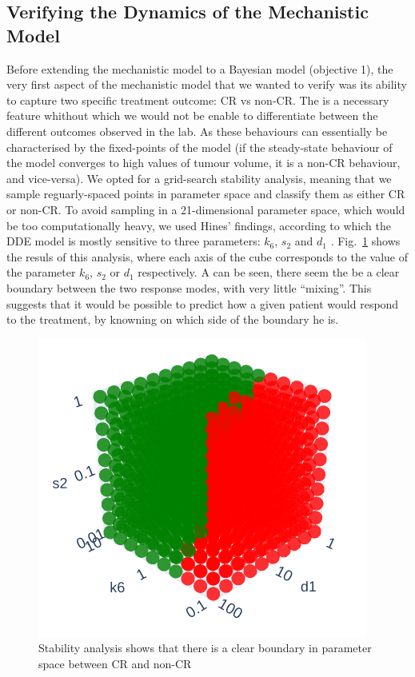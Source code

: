 \documentclass[11pt]{article}
\begin{document}
\subsection{Verifying the Dynamics of the Mechanistic Model}

Before extending the mechanistic model to a Bayesian model (objective 1), the very first aspect of the mechanistic model that we wanted to verify was its ability to capture two specific treatment outcome: CR vs non-CR. The is a necessary feature whithout which we would not be enable to differentiate between the different outcomes observed in the lab. As these behaviours can essentially be characterised by the fixed-points of the model (if the steady-state behaviour of the model converges to high values of tumour volume, it is a non-CR behaviour, and vice-versa). We opted for a grid-search stability analysis, meaning that we sample reguarly-spaced points in parameter space and classify them as either CR or non-CR. To avoid sampling in a 21-dimensional parameter space, which would be too computationally heavy, we used Hines' findings, according to which the DDE model is mostly sensitive to three parameters: $k_6$, $s_2$ and $d_1$ \cite{christian1}. Fig.~\ref{fig:mcsa} shows the resuls of this analysis, where each axis of the cube corresponds to the value of the parameter $k_6$, $s_2$ or $d_1$ respectively. A can be seen, there seem the be a clear boundary between the two response modes, with very little ``mixing''. This suggests that it would be possible to predict how a given patient would respond to the treatment, by knowning on which side of the boundary he is.

\begin{figure}[!ht]
    \centering\includegraphics[scale=0.5]{stability.png}
    \caption{Stability analysis shows that there is a clear boundary in parameter space between CR and non-CR}
    \label{fig:mcsa}
\end{figure}
\end{document}
